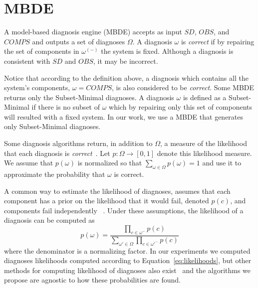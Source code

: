 \documentclass[a4paper,11pt]{report}
\newcommand\roni[1]{\textcolor{green}{roni: #1}}
\newcommand{\COMPS}{\textit{COMPS}}
\newcommand{\SD}{\textit{SD}}
\newcommand{\OBS}{\textit{OBS}}
\begin{document}
\section{MBDE}
A model-based diagnosis engine (MBDE) accepts as input $\SD$, $\OBS$, and $\COMPS$ and outputs a set of diagnoses $\Omega$. A diagnosis $\omega$ is {\em correct} if by repairing the set of components in $\omega^{(-)}$ the system is fixed. Although a diagnosis is consistent with $\SD$ and $\OBS$, it may be incorrect. 


Notice that according to the definition above, a diagnosis which contains all the system's components, $\omega = \COMPS$, is also considered to be {\em correct}. 
Some MBDE returns only the Subset-Minimal diagnoses. A diagnosis $\omega$ is defined as a Subset-Minimal if there is no subset of $\omega$ which by repairing only this set of components will resulted with a fixed system. In our work, we use a MBDE that generates only Subset-Minimal diagnoses.

Some diagnosis algorithms return, in addition to $\Omega$, a measure of the likelihood that each diagnosis is {\em correct}~\cite{williams2007conflict,abreu2011simultaneousDebugging,Stern15shely}. Let $p: \Omega \rightarrow [0,1]$ denote this likelihood measure. We assume that $p(\omega)$ is normalized so that $\sum_{\omega\in\Omega} p(\omega)=1$ and use it to approximate the probability that $\omega$ is correct.

A common way to estimate the likelihood of diagnoses, assumes that each component has a prior on the likelihood that it would fail, denoted $p(c)$, and components fail independently ~\cite{Stern17shelly}. 
Under these assumptions, the likelihood of a diagnosis can be computed as
\begin{equation}
\displaystyle p(\omega)=\frac{\prod_{c\in\omega^{-}} p(c)}{\sum_{\omega'\in\Omega}{\prod_{c\in\omega'^{-}} p(c)}}
\label{eq:likelihoods}
\end{equation}
where the denominator is a normalizing factor. 
In our experiments we computed diagnoses likelihoods computed according to Equation~\ref{eq:likelihoods}, 
but other methods for computing likelihood of diagnoses also exist~\cite{mengshoel2010probabilistic} and the algorithms we propose are agnostic to how these probabilities are found. 
\end{document}
